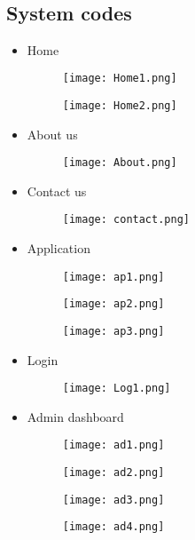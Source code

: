 \documentclass{article}
\begin{document}
\subsection{\\System codes}
\begin{itemize}
\item Home
\begin{figure}[h]
\texttt{[image: Home1.png]}
\end{figure}
\begin{figure}[h]
\texttt{[image: Home2.png]}
\end{figure}
\newpage
\item About us
\begin{figure}[h]
\texttt{[image: About.png]}
\end{figure}
\item Contact us
\begin{figure}[h]
\texttt{[image: contact.png]}
\end{figure}
\newpage
\item Application
\begin{figure}[h]
\texttt{[image: ap1.png]}
\end{figure}
\begin{figure}[h]
\texttt{[image: ap2.png]}
\end{figure}
\begin{figure}[h]
\texttt{[image: ap3.png]}
\end{figure}
\newpage
\item Login
\begin{figure}[h]
\texttt{[image: Log1.png]}
\end{figure}
\newpage
\item Admin dashboard
\begin{figure}[h]
\texttt{[image: ad1.png]}
\end{figure}
\begin{figure}[h]
\texttt{[image: ad2.png]}
\end{figure}
\begin{figure}[h]
\texttt{[image: ad3.png]}
\newpage
\end{figure}
\begin{figure}[h]
\texttt{[image: ad4.png]}
\end{figure}
\end{itemize}
\newpage
\newpage
\end{document}
